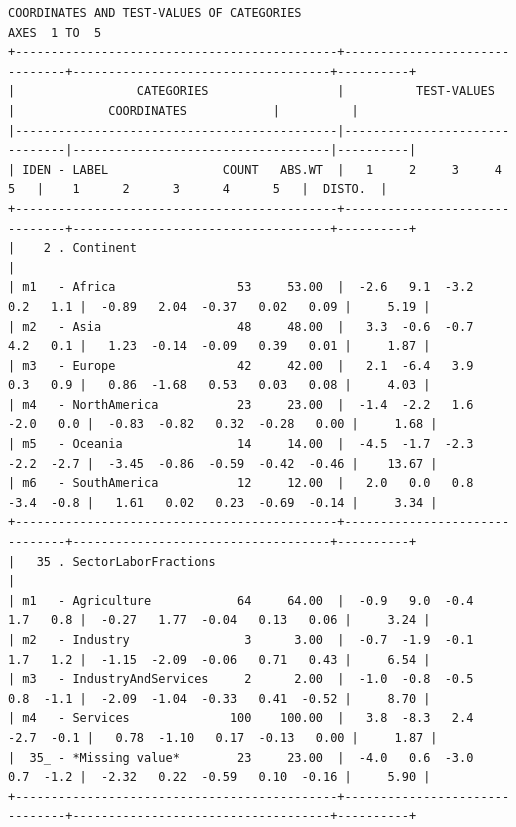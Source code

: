 \documentclass[a4paper,10pt,twocolumn]{article}
\begin{document}
\begin{landscape}
\begin{verbatim}
COORDINATES AND TEST-VALUES OF CATEGORIES
AXES  1 TO  5
+---------------------------------------------+-------------------------------+------------------------------------+----------+
|                 CATEGORIES                  |          TEST-VALUES          |             COORDINATES            |          |
|---------------------------------------------|-------------------------------|------------------------------------|----------|
| IDEN - LABEL                COUNT   ABS.WT  |   1     2     3     4     5   |    1      2      3      4      5   |  DISTO.  |
+---------------------------------------------+-------------------------------+------------------------------------+----------+
|    2 . Continent                                                                                                            |
| m1   - Africa                 53     53.00  |  -2.6   9.1  -3.2   0.2   1.1 |  -0.89   2.04  -0.37   0.02   0.09 |     5.19 |
| m2   - Asia                   48     48.00  |   3.3  -0.6  -0.7   4.2   0.1 |   1.23  -0.14  -0.09   0.39   0.01 |     1.87 |
| m3   - Europe                 42     42.00  |   2.1  -6.4   3.9   0.3   0.9 |   0.86  -1.68   0.53   0.03   0.08 |     4.03 |
| m4   - NorthAmerica           23     23.00  |  -1.4  -2.2   1.6  -2.0   0.0 |  -0.83  -0.82   0.32  -0.28   0.00 |     1.68 |
| m5   - Oceania                14     14.00  |  -4.5  -1.7  -2.3  -2.2  -2.7 |  -3.45  -0.86  -0.59  -0.42  -0.46 |    13.67 |
| m6   - SouthAmerica           12     12.00  |   2.0   0.0   0.8  -3.4  -0.8 |   1.61   0.02   0.23  -0.69  -0.14 |     3.34 |
+---------------------------------------------+-------------------------------+------------------------------------+----------+
|   35 . SectorLaborFractions                                                                                                 |
| m1   - Agriculture            64     64.00  |  -0.9   9.0  -0.4   1.7   0.8 |  -0.27   1.77  -0.04   0.13   0.06 |     3.24 |
| m2   - Industry                3      3.00  |  -0.7  -1.9  -0.1   1.7   1.2 |  -1.15  -2.09  -0.06   0.71   0.43 |     6.54 |
| m3   - IndustryAndServices     2      2.00  |  -1.0  -0.8  -0.5   0.8  -1.1 |  -2.09  -1.04  -0.33   0.41  -0.52 |     8.70 |
| m4   - Services              100    100.00  |   3.8  -8.3   2.4  -2.7  -0.1 |   0.78  -1.10   0.17  -0.13   0.00 |     1.87 |
|  35_ - *Missing value*        23     23.00  |  -4.0   0.6  -3.0   0.7  -1.2 |  -2.32   0.22  -0.59   0.10  -0.16 |     5.90 |
+---------------------------------------------+-------------------------------+------------------------------------+----------+
\end{verbatim}


\end{landscape}
\end{document}

